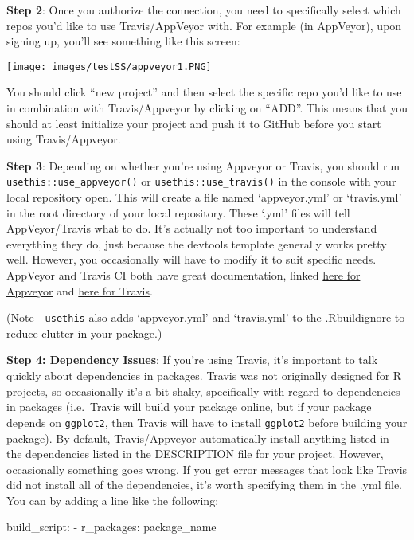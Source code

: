\documentclass[
]{book}
\newenvironment{Shaded}{\begin{snugshade}}{\end{snugshade}}
\newcommand{\NormalTok}[1]{#1}
\newcommand{\SpecialCharTok}[1]{\textcolor[rgb]{0.00,0.00,0.00}{#1}}
\begin{document}
\textbf{Step 2}: Once you authorize the connection, you need to specifically select which repos you'd like to use Travis/AppVeyor with. For example (in AppVeyor), upon signing up, you'll see something like this screen:

\texttt{[image: images/testSS/appveyor1.PNG]}

You should click ``new project'' and then select the specific repo you'd like to use in combination with Travis/Appveyor by clicking on ``ADD''. This means that you should at least initialize your project and push it to GitHub before you start using Travis/Appveyor.

\textbf{Step 3}: Depending on whether you're using Appveyor or Travis, you should run \texttt{usethis::use\_appveyor()} or \texttt{usethis::use\_travis()} in the console with your local repository open. This will create a file named `appveyor.yml' or `travis.yml' in the root directory of your local repository. These `.yml' files will tell AppVeyor/Travis what to do. It's actually not too important to understand everything they do, just because the devtools template generally works pretty well. However, you occasionally will have to modify it to suit specific needs. AppVeyor and Travis CI both have great documentation, linked \href{https://www.appveyor.com/docs/build-configuration/}{here for Appveyor} and \href{https://docs.travis-ci.com/user/languages/r/}{here for Travis}.

(Note - \texttt{usethis} also adds `appveyor.yml' and `travis.yml' to the .Rbuildignore to reduce clutter in your package.)

\textbf{Step 4: Dependency Issues}: If you're using Travis, it's important to talk quickly about dependencies in packages. Travis was not originally designed for R projects, so occasionally it's a bit shaky, specifically with regard to dependencies in packages (i.e.~Travis will build your package online, but if your package depends on \texttt{ggplot2}, then Travis will have to install \texttt{ggplot2} before building your package). By default, Travis/Appveyor automatically install anything listed in the dependencies listed in the DESCRIPTION file for your project. However, occasionally something goes wrong. If you get error messages that look like Travis did not install all of the dependencies, it's worth specifying them in the .yml file. You can by adding a line like the following:

\begin{Shaded}
\begin{Highlighting}[]
\NormalTok{build\_script}\SpecialCharTok{:}
  \SpecialCharTok{{-}}\NormalTok{ r\_packages}\SpecialCharTok{:}\NormalTok{ package\_name}
\end{Highlighting}
\end{Shaded}
\end{document}
